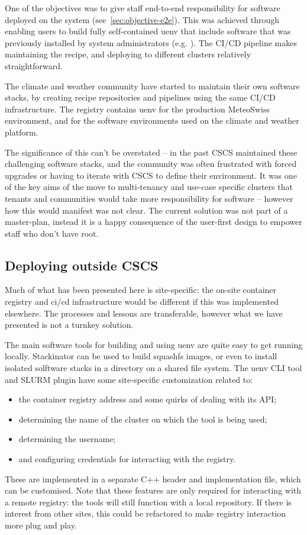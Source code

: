 One of the objectives was to give staff end-to-end responsibility for software deployed on the system (see~\ref{sec:objective-e2e}).
This was achieved through enabling users to build fully self-contained uenv that include software that was previously installed by system administrators (e.g. ).
The CI/CD pipeline makes maintaining the recipe, and deploying to different clusters relatively straightforward.

The climate and weather community have started to maintain their own software stacks, by creating recipe repositories and pipelines using the same CI/CD infrastructure.
The registry contains uenv for the production MeteoSwiss environment, and for the software environments used on the climate and weather platform.

The significance of this can't be overstated -- in the past CSCS maintained these challenging software stacks, and the community was often frustrated with forced upgrades or having to iterate with CSCS to define their environment.
It was one of the key aims of the move to multi-tenancy and use-case specific clusters that tenants and communities would take more responsibility for software -- however how this would manifest was not clear.
The current solution was not part of a master-plan, instead it is a happy consequence of the user-first design to empower staff who don't have root.

\subsection{Deploying outside CSCS}
\label{sec:discuss-site}

Much of what has been presented here is site-specific: the on-site container registry and ci/cd infrastructure would be different if this was implemented elsewhere.
The processes and lessons are transferable, however what we have presented is not a turnkey solution.

The main software tools for building and using uenv are quite easy to get running locally.
Stackinator can be used to build squashfs images, or even to install isolated solftware stacks in a directory on a shared file system.
The uenv CLI tool and SLURM plugin have some site-specific customization related to:
\begin{itemize}
    \item the container registry address and some quirks of dealing with its API;
    \item determining the name of the cluster on which the tool is being used;
    \item determining the username;
    \item and configuring credentials for interacting with the registry.
\end{itemize}
These are implemented in a separate C++ header and implementation file, which can be customised.
Note that these features are only required for interacting with a remote registry: the tools will still function with a local repository.
If there is interest from other sites, this could be refactored to make registry interaction more plug and play.

